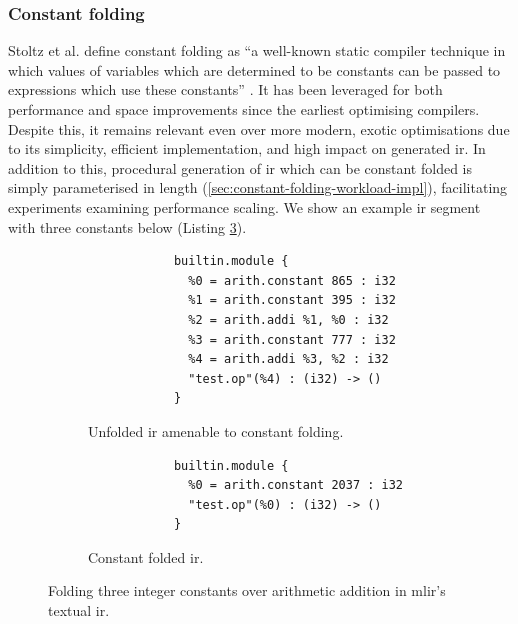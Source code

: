 \subsubsection{Constant folding}
\label{sssec:experimental-workload-constant-folding}

Stoltz et al. define constant folding as ``a well-known static compiler technique in which values of variables which are determined to be constants can be passed to expressions which use these constants'' \cite{stoltzConstantPropagationFresh1994}.
It has been leveraged for both performance and space improvements since the earliest optimising compilers. Despite this, it remains relevant even over more modern, exotic optimisations due to its simplicity, efficient implementation, and high impact on generated \ac{ir}.
In addition to this, procedural generation of \ac{ir} which can be constant folded is simply parameterised in length (\autoref{sec:constant-folding-workload-impl}), facilitating experiments examining performance scaling.
We show an example \ac{ir} segment with three constants below (Listing \ref{listing:constant-folding-workload-example}).


\begin{figure}[H]
    \centering
    \begin{subfigure}[b]{0.45\textwidth}
       \centering
        \begin{verbatim}
            builtin.module {
              %0 = arith.constant 865 : i32
              %1 = arith.constant 395 : i32
              %2 = arith.addi %1, %0 : i32
              %3 = arith.constant 777 : i32
              %4 = arith.addi %3, %2 : i32
              "test.op"(%4) : (i32) -> ()
            }
        \end{verbatim}
        \label{listing:constant-folding-workload-initial}
        \caption{Unfolded \ac{ir} amenable to constant folding.}
    \end{subfigure}
    \hfill
    \begin{subfigure}[b]{0.45\textwidth}
        \centering
        \begin{verbatim}
            builtin.module {
              %0 = arith.constant 2037 : i32
              "test.op"(%0) : (i32) -> ()
            }
        \end{verbatim}
        \footnotesize\vspace{2.5em}
        \caption{Constant folded \ac{ir}.}
        \label{listing:constant-folding-workload-folded}
    \end{subfigure}
    \vspace{1em}
    \captionsetup{name=Listing}
    \caption{Folding three integer constants over arithmetic addition in \ac{mlir}'s textual \ac{ir}.}
    \label{listing:constant-folding-workload-example}
\end{figure}

